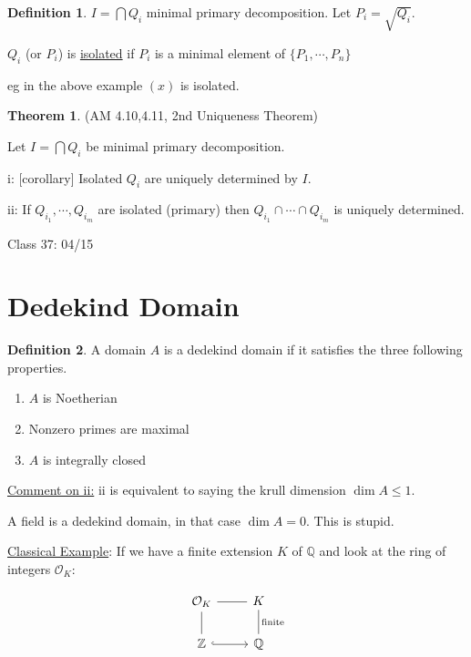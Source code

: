 \documentclass{article}
\theoremstyle{definition}
\newtheorem{definition}{Definition}
\newtheorem{theorem}{Theorem}
\begin{document}
\begin{definition}
    \(I = \bigcap Q_i\) minimal primary decomposition. Let \(P_i = \sqrt{Q_i}\).
    
    \(Q_i\) (or \(P_i\)) is \underline{isolated} if \(P_i\) is a minimal element of \(\{P_1,\cdots, P_n\}\) 
\end{definition}

eg in the above example \((x)\) is isolated.

\begin{theorem}
    (AM 4.10,4.11, 2nd Uniqueness Theorem)

    Let \(I = \bigcap Q_i\) be minimal primary decomposition.

    i: [corollary] Isolated \(Q_i\) are uniquely determined by \(I\).

    ii: If \(Q_{i_1},\cdots,Q_{i_m}\) are isolated (primary) then \(Q_{i_1}\cap\cdots\cap Q_{i_m}\) is uniquely determined.
\end{theorem}

\hrulefill

Class 37: 04/15

\section*{Dedekind Domain}

\begin{definition}
    A domain \(A\) is a dedekind domain if it satisfies the three following properties.

    \begin{enumerate}
        \item \(A\) is Noetherian
        \item Nonzero primes are maximal
        \item \(A\) is integrally closed
    \end{enumerate}
\end{definition}

\underline{Comment on ii:} ii is equivalent to saying the krull dimension \(\dim A \leq 1\).

A field is a dedekind domain, in that case \(\dim A = 0\). This is stupid.

\underline{Classical Example}: If we have a finite extension \(K\) of \(\mathbb{Q}\) and look at the ring of integers \(\mathcal{O}_K\):

\[
    \begin{tikzcd}
        \mathcal{O}_K \ar[r, no head] \ar[d, no head] & K \ar[d, no head, "\text{finite}"]\\ \mathbb{Z} \ar[r, hook] & \mathbb{Q}
    \end{tikzcd}
\]
\end{document}
